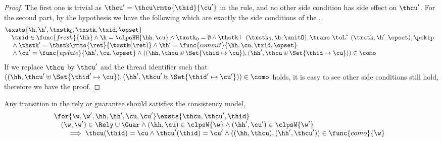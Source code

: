 \begin{proof}
The first one is trivial as \( \thcu' = \thcu\rmto{\thid}{\cu'}\) in the  rule, and no other side condition has side effect on \( \thcu' \).
For the second part, by the hypothesis we have the following which are exactly the side conditions of the ,
\[
\begin{array}{@{}l}
    \exsts{\h, \h', \txstk_{0}, \txstk, \txid, \opset } \\
    \quad \txid \in \func{fresh}{\hh}  
    \land \h = \clpsHH{\hh,\cu}
    \land \txstk_{0} = \emptyset 
    \land \thstk \vdash (\txstk_{0}, \h, \unitO), \trans \ \toL^{*} \  (\txstk, \h', \opset) , \pskip \\
    \quad {} \land \thstk' = \thstk\rmto{\ret}{\txstk(\ret)} 
    \land \hh' = \func{commit}{\hh, \cu, \txid, \opset}  \\
    \quad {} \land \cu' = \func{update}{\hh', \cu, \opset} 
    \land ((\hh,\thcu \uplus \Set{\thid \mapsto \cu}),(\hh',\thcu \uplus \Set{\thid \mapsto \cu})) \in \como
\end{array}
\]
If we replace \( \thcu \) by \( \thcu' \) and the thread identifier such that \( ((\hh, \thcu' \uplus \Set{\thid' \mapsto \cu}),(\hh',\thcu' \uplus \Set{\thid' \mapsto \cu'})) \in \como \) holds, it is easy to see other side conditions still hold, therefore we have the proof.
\end{proof}
\begin{lem}
\label{lem:rely-guar-como}
Any transition in the rely or guarantee should satisfies the consistency model,
\[
\begin{array}{@{}l}
    \for{\w, \w', \hh, \hh', \cu, \cu'}
    \exsts{\thcu, \thcu', \thid} \\
    \quad (\w, \w') \in \Rely \cup \Guar
    \land (\hh, \cu) \in \clpsW{\w}
    \land (\hh', \cu') \in \clpsW{\w'} \\
    \qquad \implies 
    \thcu(\thid) = \cu
    \land \thcu'(\thid) = \cu'
    \land ((\hh, \thcu),(\hh', \thcu')) \in \func{como}{\w}
\end{array}
\]
\end{lem}
